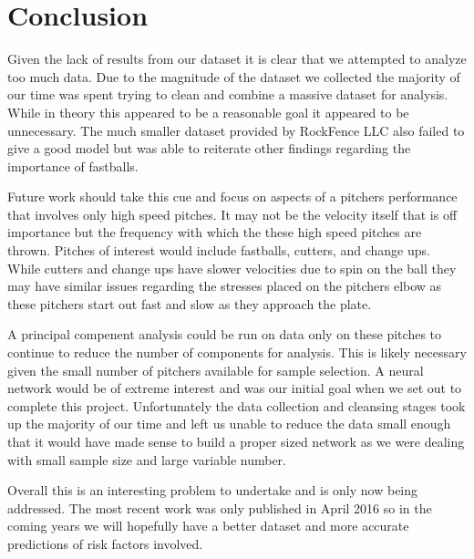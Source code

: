 \section{Conclusion}

Given the lack of results from our dataset it is clear that we attempted to analyze too much data. Due to the magnitude of the dataset we collected the majority of our time was spent trying to clean and combine a massive dataset for analysis. While in theory this appeared to be a reasonable goal it appeared to be unnecessary. The much smaller dataset provided by RockFence LLC also failed to give a good model but was able to reiterate other findings regarding the importance of fastballs.

Future work should take this cue and focus on aspects of a pitchers performance that involves only high speed pitches. It may not be the velocity itself that is off importance but the frequency with which the these high speed pitches are thrown. Pitches of interest would include fastballs, cutters, and change ups. While cutters and change ups have slower velocities due to spin on the ball they may have similar issues regarding the stresses placed on the pitchers elbow as these pitchers start out fast and slow as they approach the plate.

A principal compenent analysis could be run on data only on these pitches to continue to reduce the number of components for analysis. This is likely necessary given the small number of pitchers available for sample selection. A neural network would be of extreme interest and was our initial goal when we set out to complete this project. Unfortunately the data collection and cleansing stages took up the majority of our time and left us unable to reduce the data small enough that it would have made sense to build a proper sized network as we were dealing with small sample size and large variable number.

Overall this is an interesting problem to undertake and is only now being addressed. The most recent work was only published in April 2016 so in the coming years we will hopefully have a better dataset and more accurate predictions of risk factors involved.